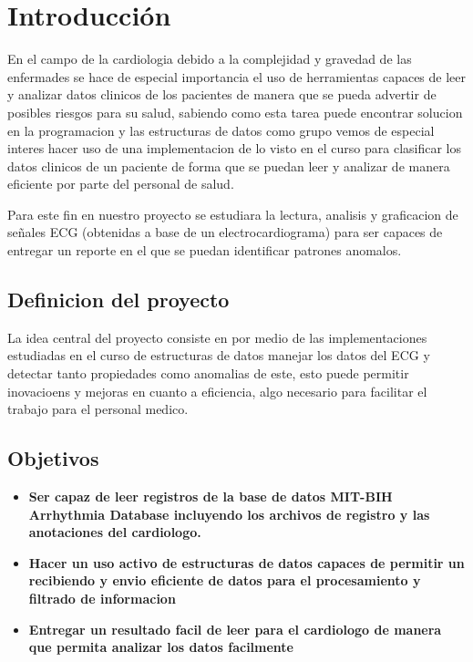 \section{Introducción}

En el campo de la cardiologia debido a la complejidad y gravedad de las enfermades se hace de especial importancia el uso de herramientas capaces de leer y analizar datos clinicos de los pacientes de manera que se pueda advertir de posibles riesgos para su salud, sabiendo como esta tarea puede encontrar solucion en la programacion y las estructuras de datos como grupo vemos de especial interes hacer uso de una implementacion de lo visto en el curso
para clasificar los datos clinicos de un paciente de forma que se puedan leer y analizar de manera eficiente por parte del personal de salud.

Para este fin en nuestro proyecto se estudiara la lectura, analisis y graficacion de señales ECG (obtenidas a base de un electrocardiograma) para ser capaces de entregar un reporte en el que se puedan identificar patrones anomalos.

\subsection{Definicion del proyecto}
La idea central del proyecto consiste en por medio de las implementaciones estudiadas en el curso de estructuras de datos manejar los datos del ECG y detectar tanto propiedades como anomalias de este, esto puede permitir inovacioens y mejoras en cuanto a eficiencia, algo necesario para facilitar el trabajo para el personal medico. 


\subsection{Objetivos}

\begin{itemize}
    \item \textbf{Ser capaz de leer registros de la base de datos MIT-BIH Arrhythmia Database incluyendo los archivos de registro y las anotaciones del cardiologo.} \cite{MIT-BIH}
    \item \textbf{Hacer un uso activo de estructuras de datos capaces de permitir un recibiendo y envio eficiente de datos para el procesamiento y filtrado de informacion}
    \item \textbf{Entregar un resultado facil de leer para el cardiologo de manera que permita analizar los datos facilmente} 
\end{itemize}
